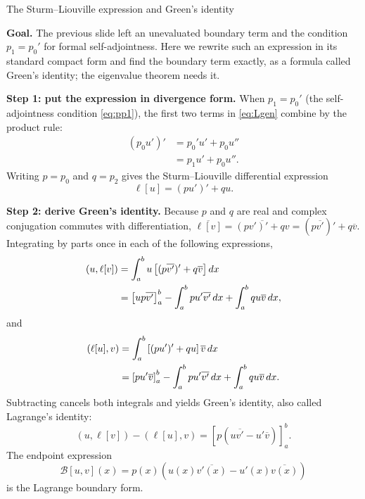 \documentclass[11pt]{beamer}
\begin{document}
\begin{frame}[allowframebreaks=1.00]{The Sturm--Liouville expression and Green's identity}
\footnotesize

\textbf{Goal.} The previous slide left an unevaluated boundary term and the condition $p_1=p_0'$
for formal self-adjointness. Here we rewrite such an expression in its standard compact form and
find the boundary term exactly, as a formula called Green's identity; the eigenvalue theorem
needs it.

\textbf{Step 1: put the expression in divergence form.}  When $p_1=p_0'$ (the self-adjointness condition \eqref{eq:pp1}), the first two terms in \eqref{eq:Lgen} combine by the product rule:
\begin{align*}
  (p_0u')'
   &=p_0'u'+p_0u''\\
   &=p_1u'+p_0u''.
\end{align*}
Writing $p=p_0$ and $q=p_2$ gives the Sturm--Liouville differential expression
\begin{equation}
  \ell[u]=(pu')'+qu.
  \label{eq:SLop}
\end{equation}

\textbf{Step 2: derive Green's identity.}  Because $p$ and $q$ are real and complex conjugation commutes with differentiation,
$\overline{\ell[v]}=\overline{(pv')'+qv}=(p\overline{v'})'+q\overline v$.  Integrating by
parts once in each of the following expressions,
\begin{align}
  (u,\ell[v])
   &=\int_a^b u\left[(p\overline{v'})'+q\overline v\right]dx \notag\\
   &=\left[up\overline{v'}\right]_a^b
     -\int_a^b p u'\overline{v'}\,dx
     +\int_a^b q u\overline v\,dx,
  \label{eq:green-first}
\end{align}
and
\begin{align}
  (\ell[u],v)
   &=\int_a^b\left[(pu')'+qu\right]\overline v\,dx \notag\\
   &=\left[pu'\overline v\right]_a^b
     -\int_a^b p u'\overline{v'}\,dx
     +\int_a^b q u\overline v\,dx.
  \label{eq:green-second}
\end{align}
Subtracting cancels both integrals and yields Green's identity, also called Lagrange's
identity:
\begin{equation}
  (u,\ell[v])-(\ell[u],v)
  =\left[p\left(u\overline{v'}-u'\overline v\right)\right]_a^b.
  \label{eq:green-identity}
\end{equation}
The endpoint expression
\begin{equation}
  \mathcal{B}[u,v](x)
  =p(x)\left(u(x)\overline{v'(x)}-u'(x)\overline{v(x)}\right)
  \label{eq:SLbdy}
\end{equation}
is the Lagrange boundary form.


\end{frame}
\end{document}
